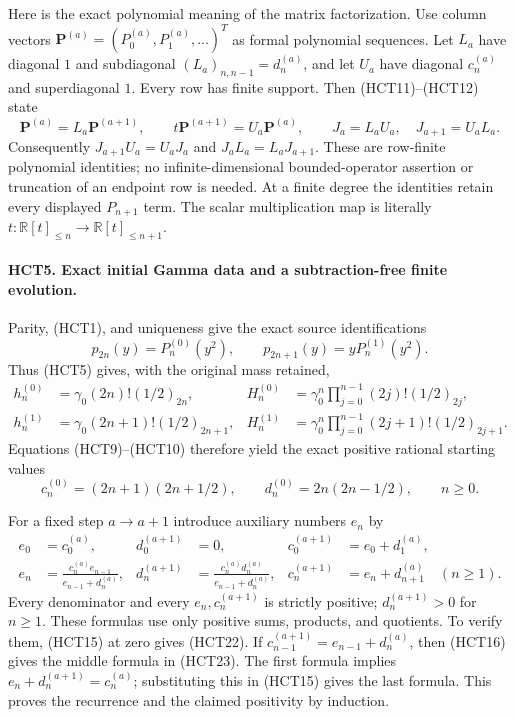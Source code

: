 Here is the exact polynomial meaning of the matrix factorization.
Use column vectors $\mathbf P^{(a)}=(P_0^{(a)},P_1^{(a)},\ldots)^T$
as formal polynomial sequences. Let $L_a$ have diagonal $1$ and
subdiagonal $(L_a)_{n,n-1}=d_n^{(a)}$, and let $U_a$ have diagonal
$c_n^{(a)}$ and superdiagonal $1$. Every row has finite support.
Then (HCT11)--(HCT12) state
\begin{equation}\tag{HCT17}
 \mathbf P^{(a)}=L_a\mathbf P^{(a+1)},\qquad
 t\mathbf P^{(a+1)}=U_a\mathbf P^{(a)},\qquad
 J_a=L_aU_a,\quad J_{a+1}=U_aL_a.
\end{equation}
Consequently $J_{a+1}U_a=U_aJ_a$ and $J_aL_a=L_aJ_{a+1}$.
These are row-finite polynomial identities; no infinite-dimensional
bounded-operator assertion or truncation of an endpoint row is
needed. At a finite degree the identities retain every displayed
$P_{n+1}$ term. The scalar multiplication map is literally
$t:\mathbb R[t]_{\leq n}\to\mathbb R[t]_{\leq n+1}$.

\paragraph{HCT5. Exact initial Gamma data and a subtraction-free finite evolution.}
Parity, (HCT1), and uniqueness give the exact source identifications
\begin{equation}\tag{HCT18}
 p_{2n}(y)=P_n^{(0)}(y^2),\qquad
 p_{2n+1}(y)=yP_n^{(1)}(y^2).
\end{equation}
Thus (HCT5) gives, with the original mass retained,
\begin{align}
 h_n^{(0)}&=\gamma_0(2n)!(1/2)_{2n},&
 H_n^{(0)}&=\gamma_0^n\prod_{j=0}^{n-1}(2j)!(1/2)_{2j},\tag{HCT19}\\
 h_n^{(1)}&=\gamma_0(2n+1)!(1/2)_{2n+1},&
 H_n^{(1)}&=\gamma_0^n\prod_{j=0}^{n-1}(2j+1)!(1/2)_{2j+1}.\tag{HCT20}
\end{align}
Equations (HCT9)--(HCT10) therefore yield the exact positive
rational starting values
\begin{equation}\tag{HCT21}
 c_n^{(0)}=(2n+1)(2n+1/2),\qquad
 d_n^{(0)}=2n(2n-1/2),\qquad n\geq0.
\end{equation}

For a fixed step $a\to a+1$ introduce auxiliary numbers $e_n$ by
\begin{align}
 e_0&=c_0^{(a)},&d_0^{(a+1)}&=0,&
 c_0^{(a+1)}&=e_0+d_1^{(a)},\tag{HCT22}\\
 e_n&=\frac{c_n^{(a)}e_{n-1}}{e_{n-1}+d_n^{(a)}},&
 d_n^{(a+1)}&=\frac{c_n^{(a)}d_n^{(a)}}{e_{n-1}+d_n^{(a)}},&
 c_n^{(a+1)}&=e_n+d_{n+1}^{(a)}\quad(n\geq1).\tag{HCT23}
\end{align}
Every denominator and every $e_n,c_n^{(a+1)}$ is strictly positive;
$d_n^{(a+1)}>0$ for $n\geq1$. These formulas use only positive
sums, products, and quotients. To verify them, (HCT15) at zero
gives (HCT22). If $c_{n-1}^{(a+1)}=e_{n-1}+d_n^{(a)}$, then
(HCT16) gives the middle formula in (HCT23). The first formula
implies $e_n+d_n^{(a+1)}=c_n^{(a)}$; substituting this in
(HCT15) gives the last formula. This proves the recurrence and
the claimed positivity by induction.

